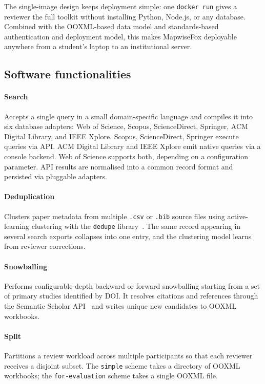 \documentclass[preprint,12pt, a4paper]{elsarticle}
\begin{document}
The single-image design keeps deployment simple: one \texttt{docker run}
gives a reviewer the full toolkit without installing Python, Node.js, or any
database. Combined with the OOXML-based data model and standards-based
authentication and deployment model, this makes MapwiseFox deployable
anywhere from a student's laptop to an institutional server.

\subsection{Software functionalities}

\paragraph{Search} Accepts a single query in a small
domain-specific language and compiles it into six database adapters:
Web of Science, Scopus, ScienceDirect, Springer, ACM Digital Library,
and IEEE Xplore. Scopus, ScienceDirect, Springer execute queries via API.
ACM Digital Library and IEEE Xplore emit native queries via a console
backend. Web of Science supports both, depending on a configuration parameter.
API results are normalised into a common record format and persisted via pluggable
adapters.

\paragraph{Deduplication} Clusters paper metadata from multiple \texttt{.csv}
or \texttt{.bib} source files using active-learning clustering with the
\texttt{dedupe} library~\cite{dedupe}. The same record appearing in several search
exports collapses into one entry, and the clustering model learns from reviewer
corrections.

\paragraph{Snowballing} Performs configurable-depth backward or forward
snowballing starting from a set of primary studies identified by DOI.
It resolves citations and references through the Semantic Scholar
API~\cite{semanticscholar}
and writes unique new candidates to OOXML workbooks.

\paragraph{Split} Partitions a review workload across multiple
participants so that each reviewer receives a disjoint subset. The
\texttt{simple} scheme takes a directory of OOXML workbooks; the
\texttt{for-evaluation} scheme takes a single OOXML file.
\end{document}
